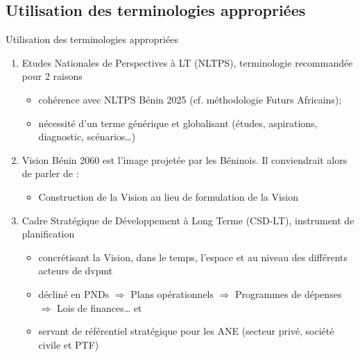 \documentclass[11pt]{beamer}
\begin{document}
\subsection{\tiny Utilisation des terminologies appropriées}
\begin{frame}{Utilisation des terminologies appropriées}

\begin{enumerate} [<+->]
 \item  \alert{Etudes Nationales de Perspectives à LT (NLTPS)}, terminologie recommandée pour 2 raisons  \vfill
     \begin{itemize} [<+->]
     \item \small cohérence avec NLTPS Bénin 2025 (cf. méthodologie Futurs Africains);  \vfill
     \item \small nécessité d’un terme générique et globalisant (études, aspirations, diagnostic, scénarios…) \vfill
      \end{itemize}
  \item  \alert{Vision Bénin 2060} est l’image projetée par les Béninois. Il conviendrait alors de parler de : \vfill
     \begin{itemize} [<+->]
    \item \small Construction de la Vision au lieu de formulation de la Vision  \vfill
    \end{itemize}
\item \alert{Cadre Stratégique de Développement à Long Terme (CSD-LT)}, instrument de planification 
     \begin{itemize} [<+->]
    \item \small concrétisant la Vision, dans le temps, l’espace et au niveau des différents acteurs de dvpmt \vfill
    \item \small décliné en PNDs $\Rightarrow$  Plans opérationnels $\Rightarrow$ Programmes de dépenses $\Rightarrow$ Lois de finances… et \vfill
    \item \small servant de référentiel stratégique pour les ANE (secteur privé, société civile et PTF) \vfill
    \end{itemize}
\end{enumerate}
\end{frame}
\end{document}
